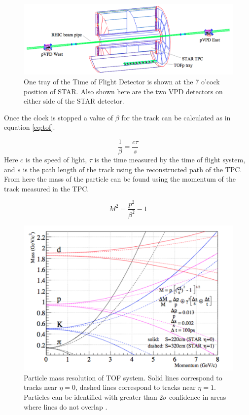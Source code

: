 \documentclass[abstract = on,listof=totoc, bibliography=totoc]{scrreprt}
\begin{document}
\begin{figure}
\begin{center}
\includegraphics[width = .9\textwidth]{starToF}
\caption[STAR Time of Flight System]{One tray of the Time of Flight Detector is shown at the 7 o'cock position of STAR. Also shown here are the two VPD detectors on either side of the STAR detector.}
\label{fig:starToF}
\end{center}
\end{figure}

Once the clock is stopped a value of $\beta$ for the track can be calculated as in equation \ref{eq:tof}. 

\begin{equation}
\label{eq:tof}
\frac{1}{\beta} = \frac{c\tau}{s}
\end{equation}
%
Here $c$ is the speed of light, $\tau$ is the time measured by the time of flight system, and $s$ is the path length of the track using the reconstructed path of the TPC. From here the mass of the particle can be found using the momentum of the track measured in the TPC.

\begin{equation}
\label{eq:mtof}
M^2 = \frac{p^2}{\beta^2} - 1
\end{equation}

\begin{figure}
\begin{center}
\includegraphics[width = 1\textwidth]{TOFpid}
\caption[Particle identification with TOF]{Particle mass resolution of TOF system. Solid lines correspond to tracks near $\eta=0$, dashed lines correspond to tracks near $\eta=1$. Particles can be identified with greater than $2\sigma$ confidence in areas where lines do not overlap \cite{largeAreaTOF}.}
\label{fig:tofPID}
\end{center}
\end{figure}
\end{document}
